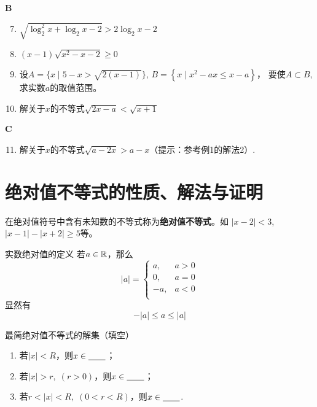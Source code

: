 \begin{center}
    \bfseries B
\end{center}

\begin{enumerate}\setcounter{enumi}{6}
    \item $\sqrt{\log_{2}^{2}x+\log_{2}x-2}> 2\log_{2}x-2$
    \item $(x-1)\sqrt{x^{2}-x-2}\ge 0$
    \item 设$A= \{ x\mid 5- x> \sqrt {2(x- 1) }\}$, 
$B=\left\{x\mid x^{2}-ax\le x-a\right\}$，
要使$A\subset B$, 求实数$a$的取值范围。
\item 解关于$x$的不等式$\sqrt{2x-a}<\sqrt{x+1}$
\end{enumerate}


\begin{center}
    \bfseries C
\end{center}

\begin{enumerate}\setcounter{enumi}{10}
    \item 解关于$x$的不等式$\sqrt{a-2x}>a-x$（提示：参考例1的解法2）.
\end{enumerate}

\section{绝对值不等式的性质、解法与证明}

在绝对值符号中含有未知数的不等式称为\textbf{绝对值不等式}。如
$|x-2|<3$, $|x-1|-|x+2|\ge 5$等。

\begin{thm}{实数绝对值的定义}
若$a\in\mathbb{R}$，那么
\[|a|=\begin{cases}
    a, &a>0\\
    0, &a=0\\
    -a, &a<0\\
\end{cases}\]
显然有$$-|a|\le a\le |a|$$
\end{thm}

\begin{thm}
    {最简绝对值不等式的解集（填空）}
\begin{enumerate}[(1)]
\item 若$|x|<R$，则$x\in \underline{\qquad}$；
\item 若$|x|>r,\; (r>0)$，则$x\in\underline{\qquad}$；
\item 若$r<|x|<R,\; (0<r<R)$，则$x\in\underline{\qquad}$.
\end{enumerate}
\end{thm}

